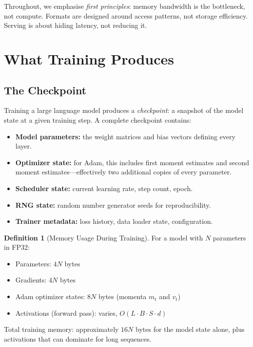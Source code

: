 \documentclass[11pt,a4paper]{article}
\theoremstyle{definition}
\newtheorem{definition}{Definition}[section]
\begin{document}
Throughout, we emphasise \emph{first principles}: memory bandwidth is the bottleneck, not compute. Formats are designed around access patterns, not storage efficiency. Serving is about hiding latency, not reducing it.

\section{What Training Produces}
\label{sec:training-output}

\subsection{The Checkpoint}

Training a large language model produces a \emph{checkpoint}: a snapshot of the model state at a given training step. A complete checkpoint contains:

\begin{itemize}
	\item \textbf{Model parameters:} the weight matrices and bias vectors defining every layer.
	\item \textbf{Optimizer state:} for Adam, this includes first moment estimates and second moment estimates---effectively two additional copies of every parameter.
	\item \textbf{Scheduler state:} current learning rate, step count, epoch.
	\item \textbf{RNG state:} random number generator seeds for reproducibility.
	\item \textbf{Trainer metadata:} loss history, data loader state, configuration.
\end{itemize}

\begin{definition}[Memory Usage During Training]
	For a model with $N$ parameters in FP32:
	\begin{itemize}
		\item Parameters: $4N$ bytes
		\item Gradients: $4N$ bytes
		\item Adam optimizer states: $8N$ bytes (momenta $m_t$ and $v_t$)
		\item Activations (forward pass): varies, $O(L \cdot B \cdot S \cdot d)$
	\end{itemize}
	Total training memory: approximately $16N$ bytes for the model state alone, plus activations that can dominate for long sequences.
\end{definition}
\end{document}
